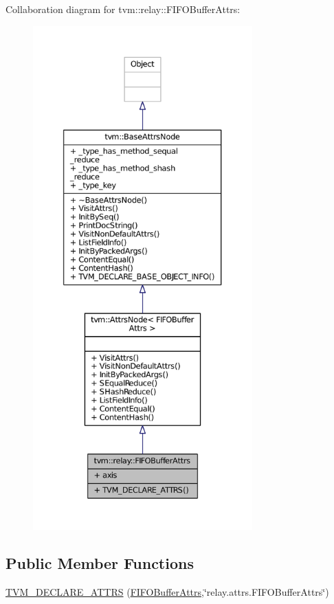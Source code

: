 Collaboration diagram for tvm\+:\+:relay\+:\+:F\+I\+F\+O\+Buffer\+Attrs\+:
\nopagebreak
\begin{figure}[H]
\begin{center}
\leavevmode
\includegraphics[height=550pt]{structtvm_1_1relay_1_1FIFOBufferAttrs__coll__graph}
\end{center}
\end{figure}
\subsection*{Public Member Functions}
\begin{DoxyCompactItemize}
\item 
\hyperlink{structtvm_1_1relay_1_1FIFOBufferAttrs_ae99c13a1a258f33c862d605e3d594467}{T\+V\+M\+\_\+\+D\+E\+C\+L\+A\+R\+E\+\_\+\+A\+T\+T\+RS} (\hyperlink{structtvm_1_1relay_1_1FIFOBufferAttrs}{F\+I\+F\+O\+Buffer\+Attrs},\char`\"{}relay.\+attrs.\+F\+I\+F\+O\+Buffer\+Attrs\char`\"{})
\end{DoxyCompactItemize}

